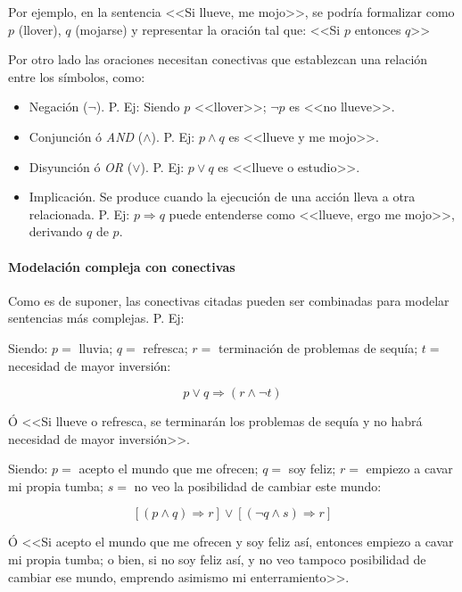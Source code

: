 \documentclass[a4paper, 11pt, titlepage]{article}
\begin{document}
            Por ejemplo, en la sentencia <<Si llueve, me mojo>>, se podría formalizar como 
            $p$ (llover), $q$ (mojarse) y representar la oración tal que: <<Si $p$ entonces $q$>>

            Por otro lado las oraciones necesitan conectivas que establezcan una relación entre 
            los símbolos, como:

            \begin{itemize}
                \item Negación ($\neg$). P. Ej: Siendo $p$ <<llover>>; $\neg p$ es <<no llueve>>.  
                \item Conjunción ó \textit{AND} ($\land$). P. Ej: $p\land q$ es <<llueve y me mojo>>.
                \item Disyunción ó \textit{OR} ($\lor$). P. Ej: $p\lor q$ es <<llueve o estudio>>.
                \item Implicación. Se produce cuando la ejecución de una acción lleva a otra relacionada.
                P. Ej: $p\Rightarrow q$ puede entenderse como <<llueve, ergo me mojo>>, derivando $q$ 
                de $p$.
            \end{itemize}

            \paragraph{Modelación compleja con conectivas} 
            
                Como es de suponer, las conectivas citadas pueden ser combinadas para modelar sentencias 
                más complejas. P. Ej:

                Siendo: $p=$ lluvia; $q=$ refresca; $r=$ terminación de problemas de sequía; $t=$
                necesidad de mayor inversión:
                
                \[p \lor q \Rightarrow (r \land \neg t)\]

                Ó <<Si llueve o refresca, se terminarán los problemas de sequía y no habrá necesidad 
                de mayor inversión>>.

                Siendo: $p=$ acepto el mundo que me ofrecen; $q=$ soy feliz; $r=$ empiezo a cavar 
                mi propia tumba; $s=$ no veo la posibilidad de cambiar este mundo:

                \[[(p \land q) \Rightarrow r] \lor [(\neg q \land s) \Rightarrow r]\]

                Ó <<Si acepto el mundo que me ofrecen y soy feliz así, entonces empiezo a cavar mi 
                propia tumba; o bien, si no soy feliz así, y no veo tampoco posibilidad de cambiar 
                ese mundo, emprendo asimismo mi enterramiento>>.
\end{document}

